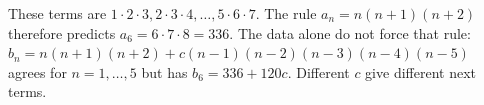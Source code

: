 These terms are $1\cdot 2\cdot 3,2\cdot 3\cdot 4,\ldots,5\cdot 6\cdot 7$. The rule $a_n=n(n+1)(n+2)$ therefore predicts $a_6=6\cdot 7\cdot 8=\boxed{336}$. The data alone do not force that rule: $b_n=n(n+1)(n+2)+c(n-1)(n-2)(n-3)(n-4)(n-5)$ agrees for $n=1,\ldots,5$ but has $b_6=336+120c$. Different $c$ give different next terms.
